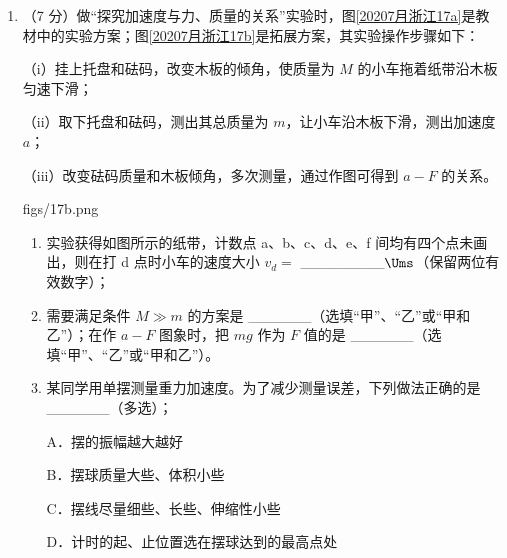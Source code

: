 \documentclass[\gkver]{gaokaozhenti}
\begin{document}
\begin{enumerate}
{B．直流电源对无人机供电的额定电流 $I=\frac{P}{U}=\frac{5000\UW}{400\UV}=12.5\UA$，选项 B 正确；

C．若空气对无人机的作用力为 $F=mg=200\UN$，则无人机上升过程中消耗的平均功率 $\overline{P}=\frac{Fh}{t}=\frac{200\times100}{200}\UW=100\UW$，但是由于空气对无人机向上的作用力不是一直为 $200\UN$，则选项 C 错误；

D．无人机上升及悬停时，螺旋桨会使周围空气产生流动，则会有部分功率用于对空气做功，选项 D 正确。

故选 BD。
}

\item
（7 分）做“探究加速度与力、质量的关系”实验时，图\ref{20207月浙江17a}是教材中的实验方案；图\ref{20207月浙江17b}是拓展方案，其实验操作步骤如下：

（i）挂上托盘和砝码，改变木板的倾角，使质量为 $M$ 的小车拖着纸带沿木板匀速下滑；

（ii）取下托盘和砝码，测出其总质量为 $m$，让小车沿木板下滑，测出加速度 $a$；

（iii）改变砝码质量和木板倾角，多次测量，通过作图可得到 $a-F$ 的关系。

{figs/17b.png}

\begin{enumerate}
	\item
	实验获得如图所示的纸带，计数点 a、b、c、d、e、f 间均有四个点未画出，则在打 d 点时小车的速度大小 $v_{d}=$ \_\_\_\_\_\_\_\_$\Ums$（保留两位有效数字）；


	\item
	需要满足条件 $M\gg m$ 的方案是 \_\_\_\_\_\_（选填“甲”、“乙”或“甲和乙”）；在作 $a-F$ 图象时，把 $mg$ 作为 $F$ 值的是 \_\_\_\_\_\_（选填“甲”、“乙”或“甲和乙”）。

	\item
	某同学用单摆测量重力加速度。为了减少测量误差，下列做法正确的是 \_\_\_\_\_\_（多选）；

	A．摆的振幅越大越好

	B．摆球质量大些、体积小些

	C．摆线尽量细些、长些、伸缩性小些

	D．计时的起、止位置选在摆球达到的最高点处


\end{enumerate}
\end{enumerate}
\end{document}
